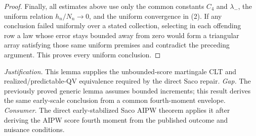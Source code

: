 \documentclass{article}
\begin{document}
\begin{proof}
Finally, all estimates above use only the common constants \(C_4\) and \(\lambda_-\), the uniform relation \(h_n/N_n\to0\), and the uniform convergence in (2).  If any conclusion failed uniformly over a stated collection, selecting in each offending row a law whose error stays bounded away from zero would form a triangular array satisfying those same uniform premises and contradict the preceding argument.  This proves every uniform conclusion.
\end{proof}
\par\smallskip\noindent \textit{Justification.} This lemma supplies the unbounded-score martingale CLT and realized/predictable-QV equivalence required by the direct Saco repair. \textit{Gap.} The previously proved generic lemma assumes bounded increments; this result derives the same early-scale conclusion from a common fourth-moment envelope. \textit{Consumer.} The direct early-stabilized Saco AIPW theorem applies it after deriving the AIPW score fourth moment from the published outcome and nuisance conditions.
\end{document}
